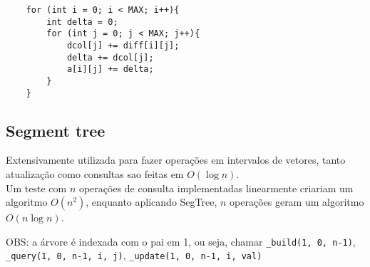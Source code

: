 \begin{verbatim}
    for (int i = 0; i < MAX; i++){
        int delta = 0;
        for (int j = 0; j < MAX; j++){
            dcol[j] += diff[i][j];
            delta += dcol[j];
            a[i][j] += delta;
        }
    }
\end{verbatim}

\subsection{Segment tree}
\par Extensivamente utilizada para fazer operações em intervalos de vetores, tanto atualização como consultas sao feitas em $O(\log n)$. \\
Um teste com $n$ operações de consulta implementadas linearmente criariam um algoritmo $O(n^2)$, enquanto aplicando SegTree, $n$ operações geram um algoritmo $O(n\log n)$.
\par OBS: a árvore é indexada com o pai em 1, ou seja, chamar \lstinline{_build(1, 0, n-1)}, \lstinline{_query(1, 0, n-1, i, j)}, \lstinline{_update(1, 0, n-1, i, val)}

